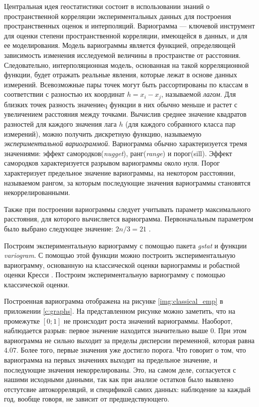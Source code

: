 Центральная идея геостатистики состоит в использовании знаний о пространственной корреляции экспериментальных данных для построения пространственных оценок и интерполяций. Вариограмма --- ключевой инструмент для оценки степени пространственной корреляции, имеющейся в данных, и для ее моделирования. Модель вариограммы является функцией, определяющей зависимость изменения исследуемой величины в пространстве от расстояния. Следовательно, интерполяционная модель, основанная на такой корреляционной функции, будет отражать реальные явления, которые лежат в основе данных измерений. Всевозможные пары точек могут быть рассортированы по классам в соответствии с разностью их координат $ h = x_i - x_j $, называемой \textit{лагом}. Для близких точек разность значениеq функции в них обычно меньше и растет с увеличением расстояния между точками. Вычислив среднее значение квадратов разностей для каждого значения лага $h$ (для каждого собранного класса пар измерений), можно получить дискретную функцию, называемую \textit{экспериментальной вариограммой}. Вариограмма обычно характеризуется тремя значениями: эффект самородков(\textit{nugget}), ранг(\textit{range}) и порог(sill). Эффект самородков характеризуется разрывом вариограммы около нуля. Порог характеризует предельное значение вариограммы, на некотором расстоянии, называемом рангом, за которым последующие значения вариограммы становятся некоррелированными.

Также при построении вариограммы следует учитывать параметр максимального расстояния, для которого вычисляется вариограмма. Первоначальным параметром было выбрано следующее значение: $ 2n / 3 = 21 $ \cite{cressie2011statistics}.

Построим экспериментальную вариограмму с помощью пакета \textit{gstat} и функции \textit{variogram}. С помощью этой функции можно построить экспериментальную вариограмму, основанную на классической оценки вариограммы и робастной оценки Кресси \cite{cressie2011statistics}. Построим экспериментальную вариограмму с помощью классической оценки.

Построенная вариограмма отображена на рисунке \ref{img:classical_emp} в приложении \ref{c:graphs}. На представленном рисунке можно заметить, что на промежутке $[0;1]$ не происходит роста значений вариограммы. Наоборот, наблюдается разрыв: первое значение находится значительно выше $0$. При этом вариограмма не сильно выходит за пределы дисперсии переменной, которая равна $4.07$. Более того, первые значения уже достигло порога. Что говорит о том, что вариограмма на первых значениях выходит на предельное значение, и последующие значения некоррелированы. Это, на самом деле, согласуется с нашими исходными данными, так как при анализе остатков было выявлено отстутсвие автокорреляций, и спецификой самих данных: наблюдение за каждый год, вообще говоря, не зависит от предшедствующего.

